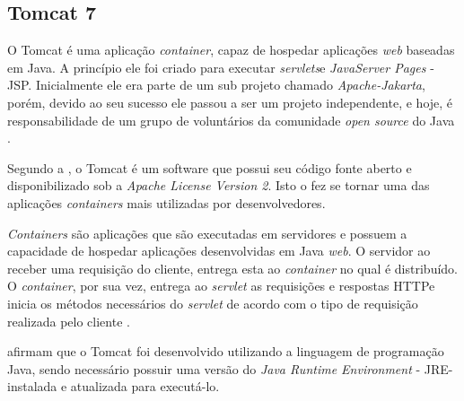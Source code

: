 \subsection{Tomcat 7}

\par O Tomcat é uma aplicação \textit{container}, capaz de hospedar aplicações \textit{web} baseadas em Java. A princípio ele foi criado para executar \textit{servlets}\footnotemark[15] e \textit{JavaServer Pages} - JSP\footnotemark[16]. Inicialmente ele era parte de um sub projeto chamado \textit{Apache-Jakarta}, porém, devido ao seu sucesso ele passou a ser um projeto independente, e hoje, é responsabilidade de um grupo de voluntários da comunidade \textit{open source} do Java \cite{vukotic_goodwill_apache_tomcat_7}.



\par Segundo a , o Tomcat é um software que possui seu código fonte aberto e disponibilizado sob a \textit{Apache License Version 2}. Isto o fez se tornar uma das aplicações \textit{containers} mais utilizadas por desenvolvedores.

\par \textit{Containers} são aplicações que são executadas em servidores e possuem a capacidade de hospedar aplicações desenvolvidas em Java \textit{web}. O servidor ao receber uma requisição do cliente, entrega esta ao \textit{container} no qual é distribuído. O \textit{container}, por sua vez, entrega ao \textit{servlet} as requisições e respostas HTTP\footnotemark[17] e inicia os métodos necessários do \textit{servlet} de acordo com o tipo de requisição realizada pelo cliente \cite{basham_sierra_bates_use_cabeca_servlets_jsp}.


\par {} afirmam que o Tomcat foi desenvolvido utilizando a linguagem de programação Java, sendo necessário possuir uma versão do \textit{Java Runtime Environment} - JRE\footnotemark[18] - instalada e atualizada para executá-lo.

